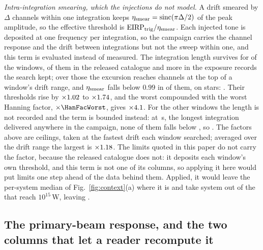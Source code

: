 \emph{Intra-integration smearing, which the injections do not model.} A drift
smeared by $\Delta$ channels within one integration keeps
$\eta_{\rm smear}=\mathrm{sinc}(\pi\Delta/2)$ of the peak amplitude, so the
effective threshold is $\mathrm{EIRP}_{\rm trig}/\eta_{\rm smear}$. Each
injected tone is deposited at one frequency per integration, so the campaign
carries the channel response and the drift between integrations but not the
sweep within one, and this term is evaluated instead of measured. The
integration length survives for \SmNMeas{} of the \NWindows{} windows,
\CsNDumpWin{} of them in the released catalogue and \SmNRecov{} more in the
exposure records the search kept; over those the excursion reaches
\SmDeltaMax{} channels at the top of a window's drift range, and
$\eta_{\rm smear}$ falls below $0.99$ in \SmNLow{} of them, on \SmNLowStar{}
stars: \SmLowStars. Their thresholds rise by $\times1.02$ to
$\times1.74$, and the worst compounded with the worst Hanning factor,
$\times\HanFacWorst$, gives $\times4.1$. For the other \SmNBound{}
windows the length is not recorded and the term is bounded instead: at
\SmDtCeil\,s, the longest integration delivered anywhere in the campaign,
none of them falls below \SmBoundEta, so \SmNoneClause. The factors above
are ceilings, taken at the fastest drift each window searched; averaged over
the drift range the largest is $\times1.18$. The limits quoted in this
paper do not carry the factor, because the released catalogue does not: it
deposits each window's own threshold, and this term is not one of its columns,
so applying it here would put \SmNLow{} limits one step ahead of the data
behind them. Applied, it would leave the per-system median of
Fig.~\ref{fig:context}(a) where it is and take \SmSysLostWord{}
system\SmSysLostPlural{} out of the \NSysEfifteen{} that reach
$10^{15}$\,W, leaving \SmSysEfifteen.

\subsection{The primary-beam response, and the two columns that let a reader
recompute it}

